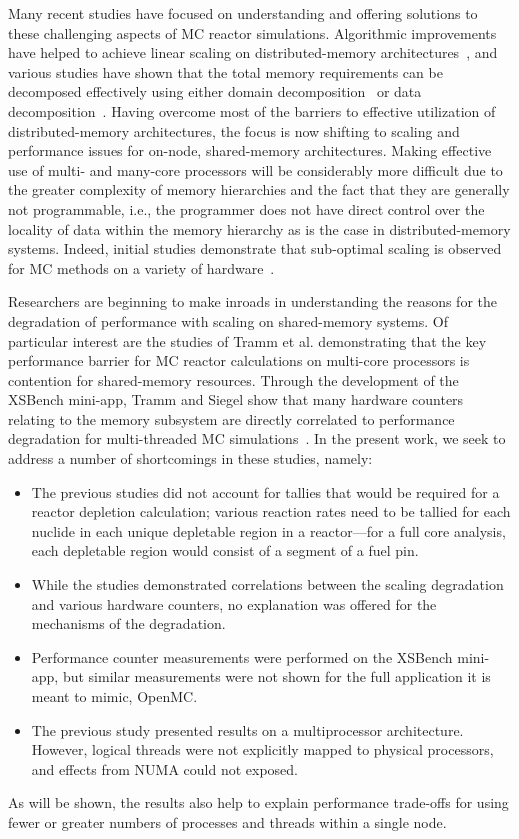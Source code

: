 \documentclass{mc2015}
\begin{document}
Many recent studies have focused on understanding and offering solutions to
these challenging aspects of MC reactor simulations. Algorithmic improvements
have helped to achieve linear scaling on distributed-memory
architectures~\cite{nse-romano-2012, ane-romano-2013}, and various studies have
shown that the total memory requirements can be decomposed effectively using
either domain decomposition~\cite{jcp-siegel-2012, jcp-siegel-2013,
  physor-horelik-2014, pc-horelik-2014} or data
decomposition~\cite{jcp-romano-2013}. Having overcome most of the barriers to
effective utilization of distributed-memory architectures, the focus is now
shifting to scaling and performance issues for on-node, shared-memory
architectures. Making effective use of multi- and many-core processors will be
considerably more difficult due to the greater complexity of memory hierarchies
and the fact that they are generally not programmable, i.e., the programmer does
not have direct control over the locality of data within the memory hierarchy
as is the case in distributed-memory systems. Indeed, initial studies
demonstrate that sub-optimal scaling is observed for MC methods on a variety of
hardware~\cite{ijhpca-siegel-2014}.

Researchers are beginning to make inroads in understanding the reasons for the
degradation of performance with scaling on shared-memory systems. Of particular
interest are the studies of Tramm et al. demonstrating that the key performance
barrier for MC reactor calculations on multi-core processors is contention for
shared-memory resources. Through the development of the XSBench mini-app, Tramm
and Siegel show that many hardware counters relating to the memory subsystem
are directly correlated to performance degradation for multi-threaded MC
simulations~\cite{physor-tramm-2014, ane-tramm-2014}. In the present work, we
seek to address a number of shortcomings in these studies, namely:
\begin{itemize}
\item The previous studies did not account for tallies that would be required
  for a reactor depletion calculation; various reaction rates need to be
  tallied for each nuclide in each unique depletable region in a reactor---for
  a full core analysis, each depletable region would consist of a segment of a
  fuel pin.
\item While the studies demonstrated correlations between the scaling
  degradation and various hardware counters, no explanation was offered for the
  mechanisms of the degradation.
\item Performance counter measurements were performed on the XSBench mini-app,
  but similar measurements were not shown for the full application it is meant
  to mimic, OpenMC.
\item The previous study presented results on a multiprocessor architecture.
  However, logical threads were not explicitly mapped to physical processors,
  and effects from NUMA could not exposed.
\end{itemize}
As will be shown, the results also help to explain performance trade-offs for
using fewer or greater numbers of processes and threads within a single node.
\end{document}
